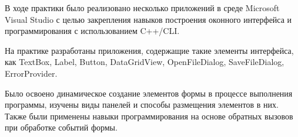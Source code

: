 \conclusion

В ходе практики было реализовано несколько приложений в среде Microsoft Visual Studio с целью закрепления навыков построения оконного интерфейса и программирования с использованием C++/CLI.

На практике разработаны приложения, содержащие такие элементы интерфейса, как TextBox, Label, Button, DataGridView, OpenFileDialog, SaveFileDialog, ErrorProvider.

Было освоено динамическое создание элементов формы в процессе выполнения программы, изучены виды панелей и способы размещения элементов в них. Также были применены навыки программирования на основе обратных вызовов при обработке событий формы.

\sectionbreak